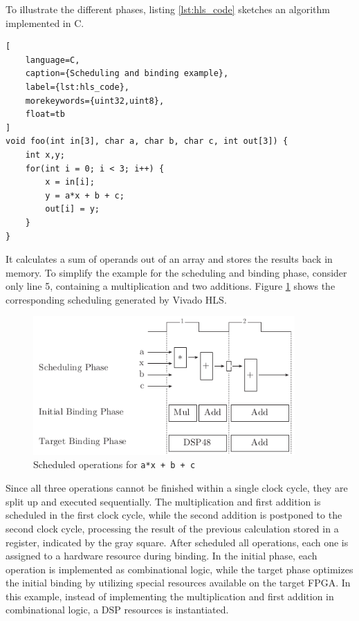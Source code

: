 To illustrate the different phases, listing \ref{lst:hls_code} sketches an
algorithm implemented in C. 
\begin{lstlisting}[
	language=C,
	caption={Scheduling and binding example},
	label={lst:hls_code},
	morekeywords={uint32,uint8},
	float=tb
]
void foo(int in[3], char a, char b, char c, int out[3]) {
	int x,y;
	for(int i = 0; i < 3; i++) {
		x = in[i];
		y = a*x + b + c;
		out[i] = y;
	}
}
\end{lstlisting}
It calculates a sum of operands out of an array and stores the results back in
memory. To simplify the example for the scheduling and binding phase, consider
only line 5, containing a multiplication and two additions. Figure
\ref{fig:hls_sb} shows the corresponding scheduling generated by Vivado
\ac{HLS}.
\begin{figure}[tb]
	\centering
	\includegraphics[width=10cm]{../figures/hls_sb}
	\caption{Scheduled operations for \lstinline{a*x + b + c}}
	\label{fig:hls_sb}
\end{figure}
Since all three operations cannot be finished within a single clock cycle,
they are split up and executed sequentially. The multiplication and first
addition is scheduled in the first clock cycle, while the second addition is
postponed to the second clock cycle, processing the result of the previous
calculation stored in a register, indicated by the gray square. After
scheduled all operations, each one is assigned to a hardware resource during
binding. In the initial phase, each operation is implemented as combinational
logic, while the target phase optimizes the initial binding by utilizing
special resources available on the target \ac{FPGA}. In this example, instead
of implementing the multiplication and first addition in combinational logic,
a \ac{DSP} resources is instantiated.

